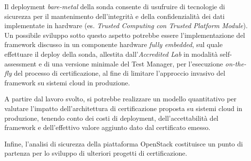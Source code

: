 \documentclass[../main.tex]{subfiles}
\begin{document}
Il deployment \textit{bare-metal} della sonda consente di usufruire di tecnologie di sicurezza per il mantenimento dell'integrità e della confidenzialità dei dati implementate in hardware (es. \textit{Trusted Computing con Trusted Platform Module}).
Un possibile sviluppo sotto questo aspetto potrebbe essere l'implementazione del framework discusso in un componente hardware \textit{fully embedded}, sul quale effettuare il deploy della sonda, allestita dall'\textit{Accredited Lab} in modalità self-assessment e di una versione minimale del Test Manager, per l'esecuzione \textit{on-the-fly} del processo di certificazione, al fine di limitare l'approccio invasivo del framework su sistemi cloud in produzione.

A partire dal lavoro svolto, si potrebbe realizzare un modello quantitativo per valutare l'impatto dell'architettura di certificazione proposta su sistemi cloud in produzione, tenendo conto dei costi di deployment, dell'accettabilità del framework e dell'effettivo valore aggiunto dato dal certificato emesso.

Infine, l'analisi di sicurezza della piattaforma OpenStack costituisce un punto di partenza per lo sviluppo di ulteriori progetti di certificazione.
\end{document}
